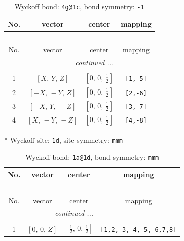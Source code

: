\documentclass[fleqn,8pt]{jsarticle}
\begin{document}
\begin{longtable}{cccc}
\caption{Wyckoff bond: {\tt 4g@1c}, bond symmetry: {\tt -1}}
 \\
 \hline \hline
No. & vector & center & mapping \\ \hline \endfirsthead

\multicolumn{3}{l}{\tablename\ \thetable{}} \\
 \hline \hline
No. & vector & center & mapping \\ \hline \endhead

 \hline \hline
\multicolumn{3}{r}{\footnotesize\it continued ...} \\ \endfoot

 \hline \hline
\multicolumn{3}{r}{} \\ \endlastfoot

1 & $\left[ X,\, Y,\, Z \right]$ & $\left[ 0,\, 0,\, \frac{1}{2} \right]$ & {\tt [1,-5]} \\ \hline
2 & $\left[ - X,\, - Y,\, Z \right]$ & $\left[ 0,\, 0,\, \frac{1}{2} \right]$ & {\tt [2,-6]} \\ \hline
3 & $\left[ - X,\, Y,\, - Z \right]$ & $\left[ 0,\, 0,\, \frac{1}{2} \right]$ & {\tt [3,-7]} \\ \hline
4 & $\left[ X,\, - Y,\, - Z \right]$ & $\left[ 0,\, 0,\, \frac{1}{2} \right]$ & {\tt [4,-8]} \\
\end{longtable}
* Wyckoff site: {\tt 1d}, site symmetry: {\tt mmm}
\renewcommand{\arraystretch}{1.2}
\begin{longtable}{cccc}
\caption{Wyckoff bond: {\tt 1a@1d}, bond symmetry: {\tt mmm}}
 \\
 \hline \hline
No. & vector & center & mapping \\ \hline \endfirsthead

\multicolumn{3}{l}{\tablename\ \thetable{}} \\
 \hline \hline
No. & vector & center & mapping \\ \hline \endhead

 \hline \hline
\multicolumn{3}{r}{\footnotesize\it continued ...} \\ \endfoot

 \hline \hline
\multicolumn{3}{r}{} \\ \endlastfoot

1 & $\left[ 0,\, 0,\, Z \right]$ & $\left[ \frac{1}{2},\, 0,\, \frac{1}{2} \right]$ & {\tt [1,2,-3,-4,-5,-6,7,8]} \\
\end{longtable}
\end{document}

